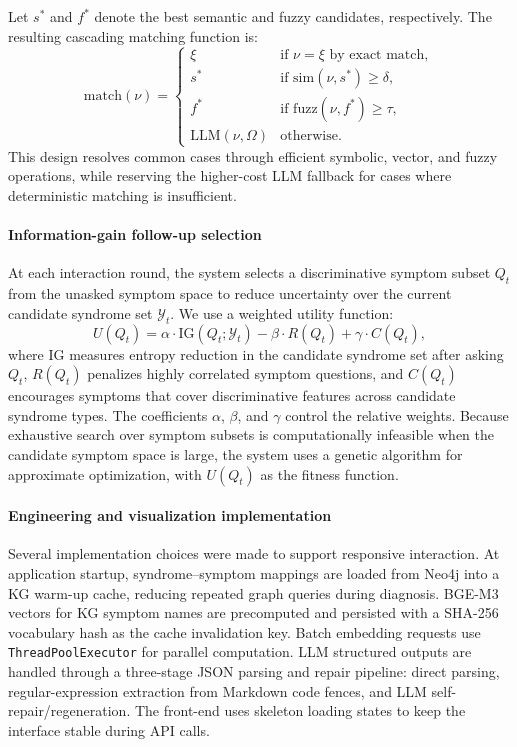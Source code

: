 Let $s^\ast$ and $f^\ast$ denote the best semantic and fuzzy candidates, respectively. The resulting cascading matching function is:
\begin{equation}\label{eq:main-match}
\mathrm{match}(\nu) = \begin{cases}
\xi & \text{if } \nu = \xi \text{ by exact match}, \\
s^\ast & \text{if } \mathrm{sim}(\nu,s^\ast) \geq \delta, \\
f^\ast & \text{if } \mathrm{fuzz}(\nu,f^\ast) \geq \tau, \\
\mathrm{LLM}(\nu,\Omega) & \text{otherwise}.
\end{cases}
\end{equation}
This design resolves common cases through efficient symbolic, vector, and fuzzy operations, while reserving the higher-cost LLM fallback for cases where deterministic matching is insufficient.

\paragraph{Information-gain follow-up selection}
At each interaction round, the system selects a discriminative symptom subset $Q_t$ from the unasked symptom space to reduce uncertainty over the current candidate syndrome set $\mathcal{Y}_t$. We use a weighted utility function:
\begin{equation}\label{eq:main-utility}
U(Q_t) =
\alpha \cdot \mathrm{IG}(Q_t;\mathcal{Y}_t)
- \beta \cdot R(Q_t)
+ \gamma \cdot C(Q_t),
\end{equation}
where $\mathrm{IG}$ measures entropy reduction in the candidate syndrome set after asking $Q_t$, $R(Q_t)$ penalizes highly correlated symptom questions, and $C(Q_t)$ encourages symptoms that cover discriminative features across candidate syndrome types. The coefficients $\alpha$, $\beta$, and $\gamma$ control the relative weights. Because exhaustive search over symptom subsets is computationally infeasible when the candidate symptom space is large, the system uses a genetic algorithm for approximate optimization, with $U(Q_t)$ as the fitness function.

\paragraph{Engineering and visualization implementation}
Several implementation choices were made to support responsive interaction. At application startup, syndrome--symptom mappings are loaded from Neo4j into a KG warm-up cache, reducing repeated graph queries during diagnosis. BGE-M3 vectors for KG symptom names are precomputed and persisted with a SHA-256 vocabulary hash as the cache invalidation key. Batch embedding requests use \texttt{ThreadPoolExecutor} for parallel computation. LLM structured outputs are handled through a three-stage JSON parsing and repair pipeline: direct parsing, regular-expression extraction from Markdown code fences, and LLM self-repair/regeneration. The front-end uses skeleton loading states to keep the interface stable during API calls.

